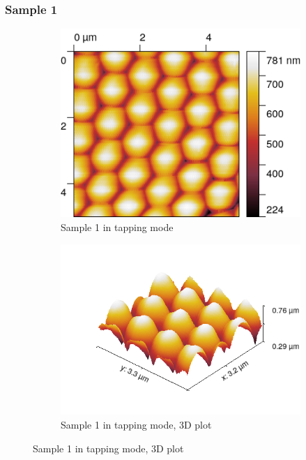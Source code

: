 \documentclass[11pt,a4paper]{article}
\begin{document}
\subsubsection{Sample 1}
\begin{figure}[H]
\centering
\begin{subfigure}[b]{0.45\textwidth}
\includegraphics[width=\textwidth]{tm_sample1}
\caption{Sample 1 in tapping mode}
\label{fig:}
\end{subfigure}
\begin{subfigure}[b]{0.45\textwidth}
\includegraphics[width=\textwidth]{tm_sample1_3D}
\caption{Sample 1 in tapping mode, 3D plot}
\label{fig:}
\end{subfigure}
\end{figure}
\end{document}
